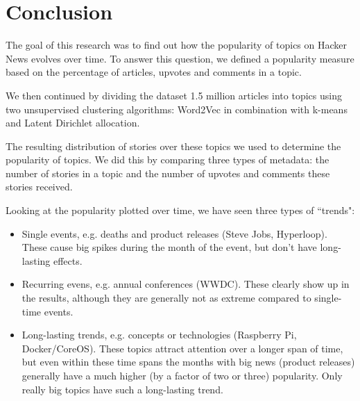 \section{Conclusion}
The goal of this research was to find out how the popularity of topics on Hacker News evolves over time. To answer this question, we defined a popularity measure based on the percentage of articles, upvotes and comments in a topic.

We then continued by dividing the dataset 1.5 million articles into topics using two unsupervised clustering algorithms: Word2Vec in combination with k-means and Latent Dirichlet allocation.

The resulting distribution of stories over these topics we used to determine the popularity of topics. We did this by comparing three types of metadata: the number of stories in a topic and the number of upvotes and comments these stories received.

Looking at the popularity plotted over time, we have seen three types of ``trends":
\begin{itemize}
\item Single events, e.g. deaths and product releases (Steve Jobs, Hyperloop). These cause big spikes during the month of the event, but don't have long-lasting effects.
\item Recurring evens, e.g. annual conferences (WWDC). These clearly show up in the results, although they are generally not as extreme compared to single-time events.
\item Long-lasting trends, e.g. concepts or technologies (Raspberry Pi, Docker/CoreOS). These topics attract attention over a longer span of time, but even within these time spans the months with big news (product releases) generally have a much higher (by a factor of two or three) popularity. Only really big topics have such a long-lasting trend.
\end{itemize}

